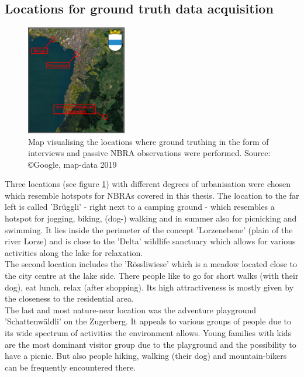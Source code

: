 \subsection{Locations for ground truth data acquisition} \label{locations_ground_truthing_data}

\begin{figure} %
    \centerline{\includegraphics[trim={0 0 0 0},clip,width=0.39\textwidth]{img/interviews_locations}}
  \caption{Map visualising the locations where ground truthing in the form of interviews and passive NBRA observations were performed. Source: \copyright Google, map-data 2019}
  \label{fig:locations_ground_truthing}
\end{figure}

Three locations (see figure \ref{fig:locations_ground_truthing}) with different degrees of urbanisation were chosen which resemble hotspots for NBRAs covered in this thesis. The location to the far left is called 'Br\"uggli' - right next to a camping ground - which resembles a hotspot for jogging, biking, (dog-) walking and in summer also for picnicking and swimming. It lies inside the perimeter of the concept 'Lorzenebene' (plain of the river Lorze) and is close to the 'Delta' wildlife sanctuary which allows for various activities along the lake for relaxation.\\
The second location includes the 'R\"ossliwiese' which is a meadow located close to the city centre at the lake side. There people like to go for short walks (with their dog), eat lunch, relax (after shopping). Its high attractiveness is mostly given by the closeness to the residential area.\\
The last and most nature-near location was the adventure playground 'Schattenw\"aldli' on the Zugerberg. It appeals to various groups of people due to its wide spectrum of activities the environment allows. Young families with kids are the most dominant visitor group due to the playground and the possibility to have a picnic. But also people hiking, walking (their dog) and mountain-bikers can be frequently encountered there.


